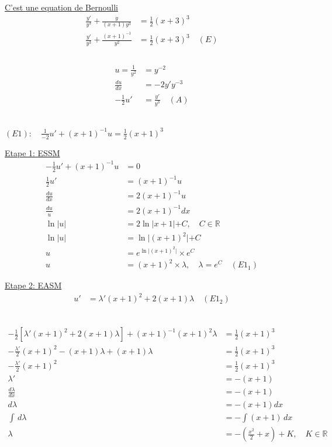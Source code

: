 \underline{C'est une equation de Bernoulli}
\begin{align*}
	\frac {y'}{y^3} + \frac{y}{(x+1)y^3} &= \frac{1}{2}(x+3)^3 \\
	\frac {y'}{y^3} + \frac{(x+1)^{-1}}{y^2} &= \frac{1}{2}(x+3)^3 \quad (E)\\ 
\end{align*}
 \\
\begin{align*}
	u = \frac{1}{y^2} &= y^{-2} \\
	\frac{du}{dx} &= -2y'y^{-3} \\
	-\frac{1}{2}u' &= \frac{y'}{y^3} \quad (A)
\end{align*}

 \\ 
$(E1): \quad \frac{1}{-2}u' + (x+1)^{-1}u = \frac{1}{2}(x+1)^3$

\underline{Etape 1: ESSM}
\begin{align}
	-\frac{1}{2}u' + (x+1)^{-1}u &= 0 \\
	\frac{1}{2}u' &= (x+1)^{-1}u \\
	\frac{du}{dx} &= 2(x+1)^{-1}u \\
	\frac{du}{u} &= 2(x+1)^{-1}dx \\
	\ln \lvert u \lvert &= 2 \ln \lvert x+1 \lvert + C, \quad C \in \mathbb{R} \\	
	\ln \lvert u \lvert &= \ln \lvert (x+1)^2 \lvert + C \\
	u &= e^{\ln \lvert (x+1)^2 \lvert} \times e^{C} \\
	u &= (x+1)^2 \times \lambda, \quad \lambda = e^{C} \quad (E1_1)
\end{align}

\underline{Etape 2: EASM}
\begin{align*}
	u' &= \lambda'(x+1)^2 + 2(x+1) \lambda \quad (E1_2)
\end{align*}

 \\
\begin{align*}
	-\frac{1}{2}[\lambda'(x+1)^2 + 2(x+1)\lambda] + (x+1)^{-1}(x+1)^2\lambda &= \frac{1}{2}(x+1)^3 \\
	-\frac{\lambda'}{2} (x+1)^2 - (x+1)\lambda + (x+1)\lambda &= \frac{1}{2}(x+1)^3 \\
	- \frac{\lambda'}{2} (x+1)^2 &= \frac{1}{2}(x+1)^3 \\
	\lambda' &= - (x+1) \\
	\frac{d\lambda}{dx}	 &= -(x+1) \\
	d\lambda &= -(x+1) dx \\
	\int \, d\lambda &= - \int (x+1) \, dx \\
	\lambda &= - (\frac{x^2}{2} + x) + K, \quad K \in \mathbb{R} \\	
\end{align*}

